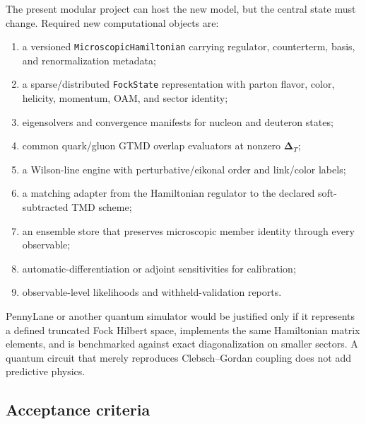 \documentclass[11pt]{article}
\newcommand{\DT}{\bm{\Delta}_{T}}
\begin{document}
The present modular project can host the new model, but the central state
must change.  Required new computational objects are:
\begin{enumerate}
  \item a versioned \texttt{MicroscopicHamiltonian} carrying regulator,
  counterterm, basis, and renormalization metadata;
  \item a sparse/distributed \texttt{FockState} representation with parton
  flavor, color, helicity, momentum, OAM, and sector identity;
  \item eigensolvers and convergence manifests for nucleon and deuteron
  states;
  \item common quark/gluon GTMD overlap evaluators at nonzero \(\DT\);
  \item a Wilson-line engine with perturbative/eikonal order and link/color
  labels;
  \item a matching adapter from the Hamiltonian regulator to the declared
  soft-subtracted TMD scheme;
  \item an ensemble store that preserves microscopic member identity through
  every observable;
  \item automatic-differentiation or adjoint sensitivities for calibration;
  \item observable-level likelihoods and withheld-validation reports.
\end{enumerate}

PennyLane or another quantum simulator would be justified only if it
represents a defined truncated Fock Hilbert space, implements the same
Hamiltonian matrix elements, and is benchmarked against exact diagonalization
on smaller sectors.  A quantum circuit that merely reproduces Clebsch--Gordan
coupling does not add predictive physics.

\subsection{Acceptance criteria}
\end{document}
